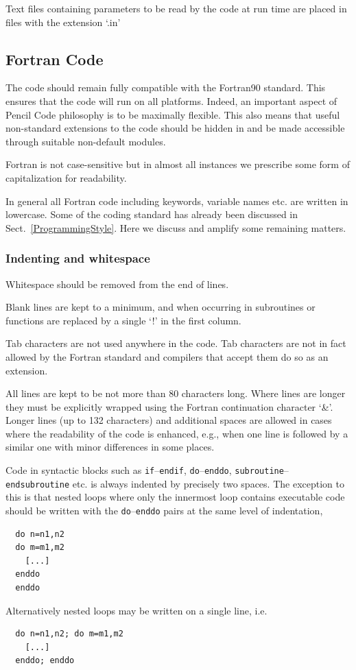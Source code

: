 \documentclass[\mydriver,12pt,twoside,notitlepage,a4paper]{article}
\newcommand{\code}[1]{\texttt{#1}}
\begin{document}
Text files containing parameters to be read by the code at run time are
placed in files with the extension `.in'

\subsection{Fortran Code}
\label{CodingStandards}

The code should remain fully compatible with the Fortran90 standard.
This ensures that the code will run on all platforms.
Indeed, an important aspect of {\sc Pencil Code} philosophy is to be maximally flexible.
This also means that useful non-standard extensions to the code should be hidden in and
be made accessible through suitable non-default modules.

Fortran is not case-sensitive but in almost all instances we prescribe
some form of capitalization for readability.

In general all Fortran code including keywords, variable names etc. are
written in lowercase.
Some of the coding standard has already been discussed in
Sect.~\ref{ProgrammingStyle}.
Here we discuss and amplify some remaining matters.

\subsubsection{Indenting and whitespace}

Whitespace should be removed from the end of lines.

Blank lines are kept to a minimum, and when occurring in subroutines
or functions are replaced by a single `!' in the first column.

Tab characters are not used anywhere in the code.  Tab characters are
not in fact allowed by the Fortran standard and compilers that accept
them do so as an extension.

All lines are kept to be not more than 80 characters long.
Where lines are longer they must be explicitly wrapped using the
Fortran continuation character `\&'.
Longer lines (up to 132 characters) and additional spaces are allowed
in cases where the readability of the code is enhanced, e.g., when one
line is followed by a similar one with minor differences in some places.

Code in syntactic blocks such as \code{if}--\code{endif}, \code{do}--\code{enddo},
\code{subroutine}--\code{endsubroutine} etc. is always indented by precisely two spaces.
The exception to this is that nested loops where only the innermost loop
contains executable code should be written with the \code{do}--\code{enddo}
pairs at the same level of indentation,
\begin{verbatim}
  do n=n1,n2
  do m=m1,m2
    [...]
  enddo
  enddo
\end{verbatim}
Alternatively nested loops may be written on a single line, i.e.
\begin{verbatim}
  do n=n1,n2; do m=m1,m2
    [...]
  enddo; enddo
\end{verbatim}
\end{document}
